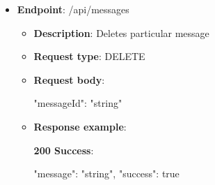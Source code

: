 \begin{itemize}
\begin{itemize}
        \textbf{200 Success}:

        \begin{spverbatim}
        {
            "message": "string",
            "success": true
        }
        \end{spverbatim}

        \textbf{400 Bad Request}:

        \begin{spverbatim}
        {
            "errorMessage": "string",
            "errorDetails": "string",
            "statusCode": 0,
            "success": true
        }
        \end{spverbatim}

        \textbf{409 Conflict}:

        \begin{spverbatim}
        {
            "errorMessage": "string",
            "errorDetails": "string",
            "statusCode": 0,
            "success": true
        }
        \end{spverbatim}

        \item \textbf{Response messages}:
        \begin{enumerate}
            \item Success.
            \item User not found.
        \end{enumerate}
    \end{itemize}

    \item \textbf{Endpoint}: /api/messages
    \begin{itemize}
        \item \textbf{Description}: Deletes particular message
        \item \textbf{Request type}: DELETE
        \item \textbf{Request body}:

        \begin{spverbatim}
        {
            "messageId": "string"
        }
        \end{spverbatim}
        \item \textbf{Response example}:

        \textbf{200 Success}:

        \begin{spverbatim}
        {
            "message": "string",
            "success": true
        }
        \end{spverbatim}


\end{itemize}
\end{itemize}
